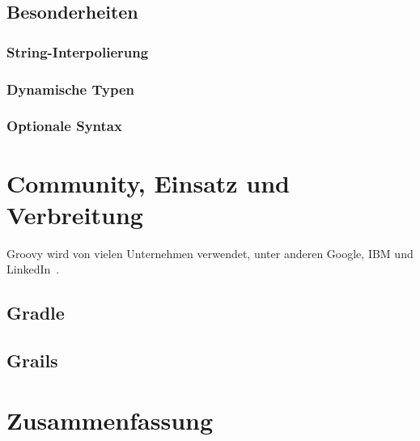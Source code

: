 	\subsection{Besonderheiten}\label{subsec:besonderheiten}

	\subsubsection{String-Interpolierung}\label{subsubsec:string-interpolierung}

	\subsubsection{Dynamische Typen}\label{subsubsec:dynamische-typen}

	\subsubsection{Optionale Syntax}\label{subsubsec:optionale-syntax}


	\section{Community, Einsatz und Verbreitung}\label{sec:community}

	Groovy wird von vielen Unternehmen verwendet, unter anderen Google, IBM und LinkedIn~\cite{groovy-lang:main,wiki:Groovy}.

	\subsection{Gradle}\label{subsec:gradle}

	\subsection{Grails}\label{subsec:grails}


	\section{Zusammenfassung}\label{sec:zusammenfassung}


	
	


